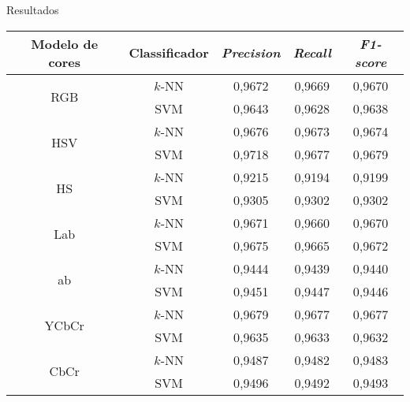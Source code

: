 \begin{frame}{Resultados}
\begin{table}[!htpb]
\centering
\begin{small}
\setlength{\tabcolsep}{4pt}

\begin{tabular}{|c|c|c|c|c|}\hline
 Modelo de cores & Classificador & \emph{Precision} & \emph{Recall} & \emph{F1-score} \\ \hline
 \multirow{2}{*}{RGB}   & $k$-NN  & 0,9672 & 0,9669 & 0,9670 \\ \cline{2-5}
                        & SVM     & 0,9643 & 0,9628 & 0,9638 \\ \hline
 \multirow{2}{*}{HSV}   & $k$-NN  & 0,9676 & 0,9673 & 0,9674 \\ \cline{2-5}
                        & \alert{SVM}     & \alert{0,9718} & \alert{0,9677} & \alert{0,9679} \\ \hline
 \multirow{2}{*}{HS}    & $k$-NN  & 0,9215 & 0,9194 & 0,9199 \\ \cline{2-5}
                        & SVM     & 0,9305 & 0,9302 & 0,9302 \\ \hline
 \multirow{2}{*}{Lab}   & $k$-NN  & 0,9671 & 0,9660 & 0,9670 \\ \cline{2-5}
                        & SVM     & 0,9675 & 0,9665 & 0,9672 \\ \hline
 \multirow{2}{*}{ab}    & $k$-NN  & 0,9444 & 0,9439 & 0,9440 \\ \cline{2-5}
                        & SVM     & 0,9451 & 0,9447 & 0,9446 \\ \hline
 \multirow{2}{*}{YCbCr} & \alert{$k$-NN}  & \alert{0,9679} & \alert{0,9677} & \alert{0,9677} \\ \cline{2-5}
                        & SVM     & 0,9635 & 0,9633 & 0,9632 \\ \hline
 \multirow{2}{*}{CbCr}  & \alert{$k$-NN}  & \alert{0,9487} & \alert{0,9482} & \alert{0,9483} \\ \cline{2-5}
                        & \alert{SVM}     & \alert{0,9496} & \alert{0,9492} & \alert{0,9493} \\ \hline

\end{tabular}
\end{small}
\end{table}
\end{frame}

